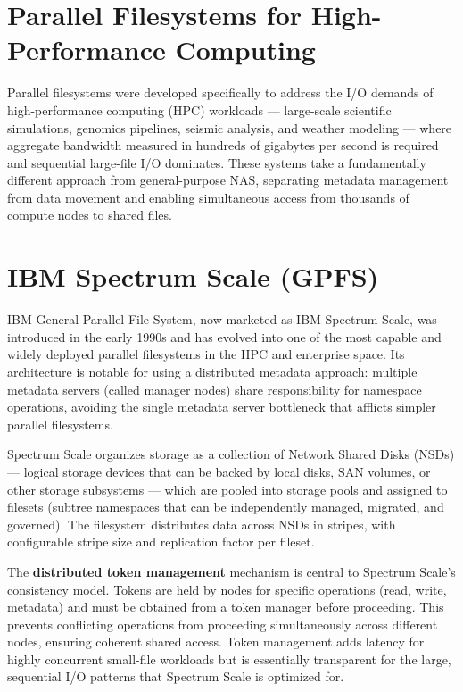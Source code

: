 \section{Parallel Filesystems for High-Performance Computing}
Parallel filesystems were developed specifically to address the I/O demands of high-performance computing (HPC) workloads --- large-scale scientific simulations, genomics pipelines, seismic analysis, and weather modeling --- where aggregate bandwidth measured in hundreds of gigabytes per second is required and sequential large-file I/O dominates. These systems take a fundamentally different approach from general-purpose NAS, separating metadata management from data movement and enabling simultaneous access from thousands of compute nodes to shared files.

\section{IBM Spectrum Scale (GPFS)}
IBM General Parallel File System, now marketed as IBM Spectrum Scale, was introduced in the early 1990s and has evolved into one of the most capable and widely deployed parallel filesystems in the HPC and enterprise space. Its architecture is notable for using a distributed metadata approach: multiple metadata servers (called manager nodes) share responsibility for namespace operations, avoiding the single metadata server bottleneck that afflicts simpler parallel filesystems.

Spectrum Scale organizes storage as a collection of Network Shared Disks (NSDs) --- logical storage devices that can be backed by local disks, SAN volumes, or other storage subsystems --- which are pooled into storage pools and assigned to filesets (subtree namespaces that can be independently managed, migrated, and governed). The filesystem distributes data across NSDs in stripes, with configurable stripe size and replication factor per fileset.

The \textbf{distributed token management} mechanism is central to Spectrum Scale's consistency model. Tokens are held by nodes for specific operations (read, write, metadata) and must be obtained from a token manager before proceeding. This prevents conflicting operations from proceeding simultaneously across different nodes, ensuring coherent shared access. Token management adds latency for highly concurrent small-file workloads but is essentially transparent for the large, sequential I/O patterns that Spectrum Scale is optimized for.

